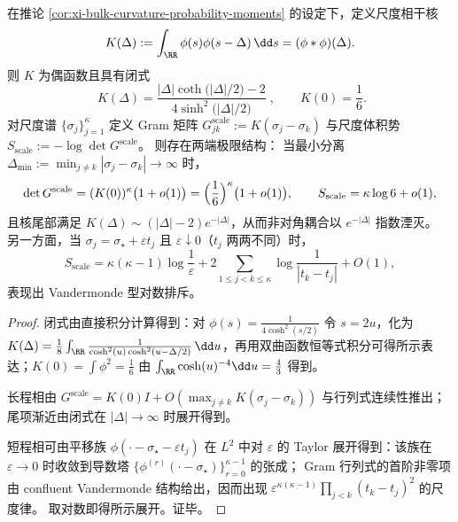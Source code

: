 \begin{proposition}\label{prop:xi-bulk-curvature-scale-gram-two-phase}
在推论 \ref{cor:xi-bulk-curvature-probability-moments} 的设定下，定义尺度相干核
\[
K(\Delta):=\int_{\RR}\phi(s)\phi(s-\Delta)\,\dd s=(\phi*\phi)(\Delta).
\]
则 \(K\) 为偶函数且具有闭式
\[
\boxed{\;
K(\Delta)=\frac{|\Delta|\coth\!\bigl(|\Delta|/2\bigr)-2}{4\sinh^{2}\!\bigl(|\Delta|/2\bigr)}\; } ,
\qquad
K(0)=\frac{1}{6}.
\]
对尺度谱 \(\{\sigma_j\}_{j=1}^{\kappa}\) 定义 Gram 矩阵
\(
G^{\mathrm{scale}}_{jk}:=K(\sigma_j-\sigma_k)
\)
与尺度体积势
\(
S_{\mathrm{scale}}:=-\log\det G^{\mathrm{scale}}
\)。
则存在两端极限结构：
当最小分离 \(\Delta_{\min}:=\min_{j\neq k}|\sigma_j-\sigma_k|\to\infty\) 时，
\[
\det G^{\mathrm{scale}}=(K(0))^{\kappa}\bigl(1+o(1)\bigr)=\Bigl(\frac16\Bigr)^{\kappa}\bigl(1+o(1)\bigr),
\qquad
S_{\mathrm{scale}}=\kappa\log 6+o(1),
\]
且核尾部满足 \(K(\Delta)\sim (|\Delta|-2)e^{-|\Delta|}\)，从而非对角耦合以 \(e^{-|\Delta|}\) 指数湮灭。
另一方面，当 \(\sigma_j=\sigma_\star+\varepsilon t_j\) 且 \(\varepsilon\downarrow0\)（\(t_j\) 两两不同）时，
\[
S_{\mathrm{scale}}
=\kappa(\kappa-1)\log\frac{1}{\varepsilon}
+2\sum_{1\le j<k\le \kappa}\log\frac{1}{|t_k-t_j|}
+O(1),
\]
表现出 Vandermonde 型对数排斥。
\end{proposition}
\begin{proof}
闭式由直接积分计算得到：对 \(\phi(s)=\frac{1}{4\cosh^{2}(s/2)}\) 令 \(s=2u\)，化为
\(
K(\Delta)=\frac18\int_{\RR}\frac{1}{\cosh^{2}(u)\cosh^{2}(u-\Delta/2)}\,\dd u
\)，再用双曲函数恒等式积分可得所示表达；\(K(0)=\int \phi^2=\frac16\) 由 \(\int_{\RR}\cosh(u)^{-4}\dd u=\frac43\) 得到。
\par
长程相由 \(G^{\mathrm{scale}}=K(0)I+O(\max_{j\neq k}K(\sigma_j-\sigma_k))\) 与行列式连续性推出；尾项渐近由闭式在 \(|\Delta|\to\infty\) 时展开得到。
\par
短程相可由平移族 \(\phi(\cdot-\sigma_\star-\varepsilon t_j)\) 在 \(L^2\) 中对 \(\varepsilon\) 的 Taylor 展开得到：该族在 \(\varepsilon\to0\) 时收敛到导数塔 \(\{\phi^{(r)}(\cdot-\sigma_\star)\}_{r=0}^{\kappa-1}\) 的张成；
Gram 行列式的首阶非零项由 confluent Vandermonde 结构给出，因而出现 \(\varepsilon^{\kappa(\kappa-1)}\prod_{j<k}(t_k-t_j)^2\) 的尺度律。
取对数即得所示展开。证毕。
\end{proof}

